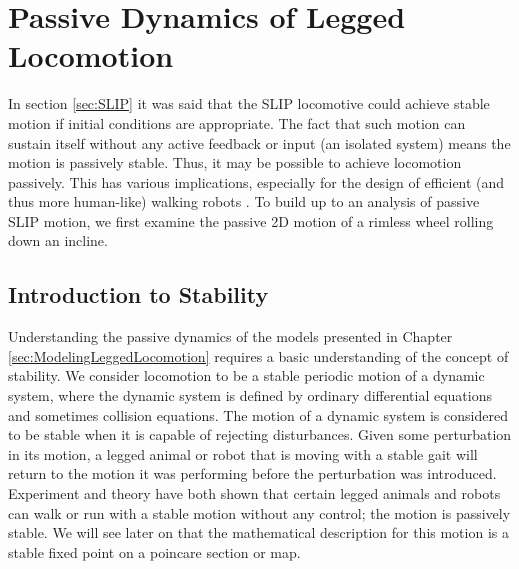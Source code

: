 \chapter{Passive Dynamics of Legged Locomotion}
\label{sec:PassiveDynamicsOfLeggedLocomotion}

In section \ref{sec:SLIP} it was said that the SLIP locomotive could achieve stable motion if initial conditions are appropriate. The fact that such motion can sustain itself without any active feedback or input (an isolated system) means the motion is passively stable. Thus, it may be possible to achieve locomotion passively. This has various implications, especially for the design of efficient (and thus more human-like) walking robots \cite{collins}. To build up to an analysis of passive SLIP motion, we first examine the passive 2D motion of a rimless wheel rolling down an incline.




\section{Introduction to Stability} %
\label{sec:IntroductionToStability}

Understanding the passive dynamics of the models presented in Chapter \ref{sec:ModelingLeggedLocomotion} requires a basic understanding of the concept of stability. We consider locomotion to be a stable periodic motion of a dynamic system, where the dynamic system is defined by ordinary differential equations and sometimes collision equations. The motion of a dynamic system is considered to be stable when it is capable of rejecting disturbances. Given some perturbation in its motion, a legged animal or robot  that is moving with a stable gait will return to the motion it was performing before the perturbation was introduced. Experiment and theory have both shown that certain legged animals and robots can walk or run with a stable motion without any control; the motion is passively stable. We will see later on that the mathematical description for this motion is a stable fixed point on a poincare section or map. 

